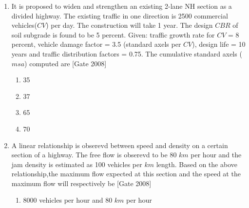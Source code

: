 \documentclass[journal]{IEEEtran}
\begin{document}
\begin{enumerate}
\begin{figure}[h]
{\begin{tikzpicture}
    
\end{tikzpicture}}
\end{figure}

		The critical lane volume on the major road changes to 440 vehicles per hour per lane and the critical lane volume on the minor road remains unchanged. The green time will \hfill [Gate 2008]
\begin{multicols}{2}
	\begin{enumerate}
		\item increase for the major road and remain same for the minor road
		\item increase for the major road and decrease for the minor road

		\item decrease for both the roads
		\item remain unchanged for both the roads
	\end{enumerate}
\end{multicols}
	\item It is proposed to widen and strengthen an existing 2-lane NH section as a divided highway. The existing traffic in one direction is 2500 commercial vehicles($CV$) per day. The construction will take 1 year. The design $CBR$ of soil subgrade is found to be 5 percent. Given: traffic growth rate for $CV$ = 8 percent, vehicle damage factor = 3.5 (standard axels per $CV$), design life = 10 years and traffic distribution factors = 0.75. The cumulative standard axels ($msa$) computed are \hfill [Gate 2008]
\begin{multicols}{2}
	\begin{enumerate}
		\item 35
		\item 37
		\item 65
		\item 70
	\end{enumerate}
\end{multicols}	
	\item A linear relationship is obserevd between speed and density on a certain section of a highway. The free flow is obserevd to be 80 $km$ per hour and the jam density is estimated as 100 vehicles per $km$ length. Based on the above relationship,the maximum flow expected at this section and the speed at the maximum flow will respectively be \hfill [Gate 2008]
\begin{multicols}{2} 
	\begin{enumerate}
		\item 8000 vehicles per hour and 80 $km$ per hour

\end{enumerate}
\end{multicols}
\end{enumerate}
\end{document}
